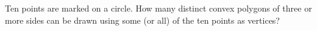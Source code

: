 Ten points are marked on a circle. How many distinct convex polygons of three or more sides can be drawn using some (or all) of the ten points as vertices?